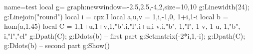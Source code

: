 \documentclass[border=5mm]{standalone}%
\begin{document}
\begin{luadraw}{name=test}
local g= graph:new{window={-2.5,2.5,-4,2},size={10,10}}
g:Linewidth(24); g:Linejoin("round")
local i = cpx.I
local a,u,v = {1,i,-1,0}, 1+i,1-i
local b = hom(a,1.45)
local C = {1,1+u,1+v,1,"b",i,"l",i+u,i-v,i,"b",-1,"l",-1-v,-1-u,-1,"b",-i,"l","cl"}
g:Dpath(C); g:Ddots(b)  -- first part
g:Setmatrix({-2*i,1,-i}); g:Dpath(C); g:Ddots(b) -- second part
g:Show()
\end{luadraw}
\end{document}
